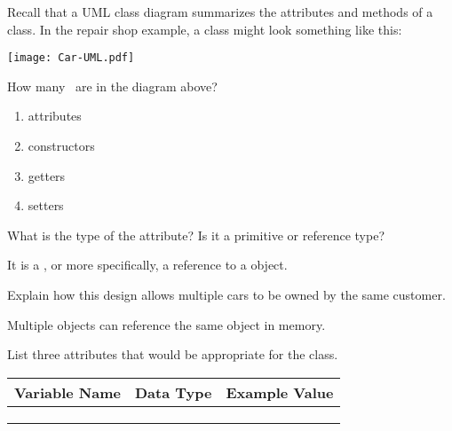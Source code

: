 
\begin{multicols}{2}

Recall that a UML class diagram summarizes the attributes and methods of a class.
In the repair shop example, a  class might look something like this:

\columnbreak
\centering

\vspace*{-4.5em}
\texttt{[image: Car-UML.pdf]}

\end{multicols}




\Q How many \blank\ are in the diagram above?

\begin{multicols}{2}
\begin{enumerate}[itemsep=1ex]
\item attributes 
\item constructors 
\item getters 
\item setters 
\end{enumerate}
\end{multicols}


\Q What is the type of the  attribute? Is it a primitive or reference type?

\begin{answer}[2em]
It is a , or more specifically, a reference to a  object.
\end{answer}


\Q Explain how this design allows multiple cars to be owned by the same customer.

\begin{answer}[2em]
Multiple  objects can reference the same  object in memory.
\end{answer}




\Q List three attributes that would be appropriate for the  class.

\begin{center}
\begin{tabularx}{38.5em}{L{8.5em}|L{8.5em}|X}
Variable Name       & Data Type          & Example Value                    \\
\hline
{}     &   &      \\
  &   &   \\
    &   &      \\
\end{tabularx}
\end{center}


